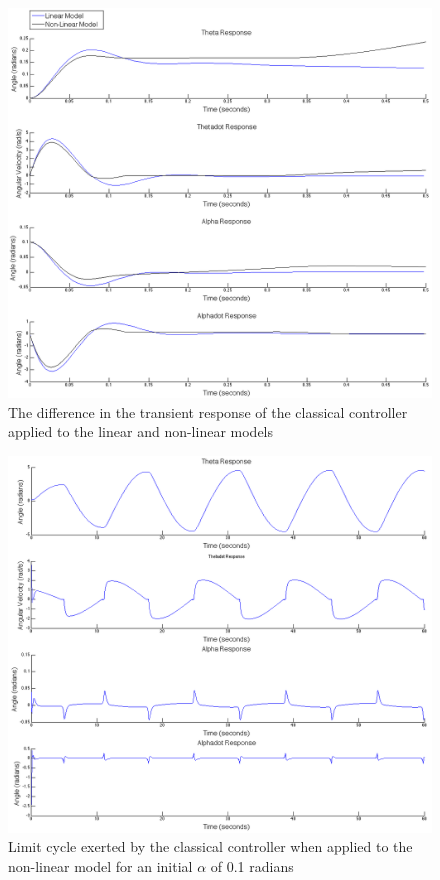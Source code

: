 \documentclass{article}
\theoremstyle{plain}
\theoremstyle{definition}
\theoremstyle{remark}
\begin{document}
\begin{figure}
\begin{center}
\includegraphics[width = 15cm]{classicaltransientLinearvsNonLinear.png}
\end{center}
\caption{The difference in the transient response of the classical controller applied to the linear and non-linear models}
\label{q8classicaltransientCompare}
\end{figure}

\begin{figure}
\begin{center}
\includegraphics[width = 15cm]{ClassicalLimitCycle.png}
\end{center}
\caption{Limit cycle exerted by the classical controller when applied to the non-linear model for an initial $\alpha$ of 0.1 radians}
\label{ClassicalLimitCycle}
\end{figure}
\end{document}
